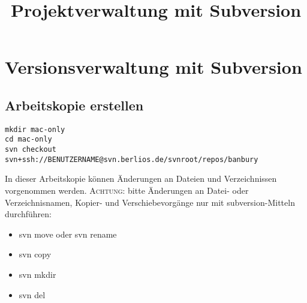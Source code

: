 \documentclass[
  final,      %
  idxtotoc,   %
  tocleft,    %
  a4paper,    %
  abstracton, %
  titlepage,  %
  oneside,    %
  DIVcalc
]{scrartcl}
\newcommand{\ABSCHNITTSTRENNER}{\cleardoublepage }
\begin{document}
\title{
Projektverwaltung mit Subversion
}
\author{}
\maketitle
\thispagestyle{plainwfl}

\mbox{}

\vfill




\markleft{}

\ABSCHNITTSTRENNER
{}
\tableofcontents

\ABSCHNITTSTRENNER
{}
\section{Versionsverwaltung mit Subversion}

\subsection{Arbeitskopie erstellen}
\begin{Verbatim}
mkdir mac-only 
cd mac-only 
svn checkout svn+ssh://BENUTZERNAME@svn.berlios.de/svnroot/repos/banbury
\end{Verbatim}

In dieser Arbeitskopie können Änderungen an Dateien und Verzeichnissen
vorgenommen werden. \textsc{Achtung}: bitte Änderungen an Datei- oder
Verzeichnisnamen, Kopier- und Verschiebevorgänge nur mit
subversion-Mitteln durchführen:
\begin{itemize}
\item svn move oder svn rename
\item svn copy
\item svn mkdir
\item svn del
\end{itemize}
\end{document}
